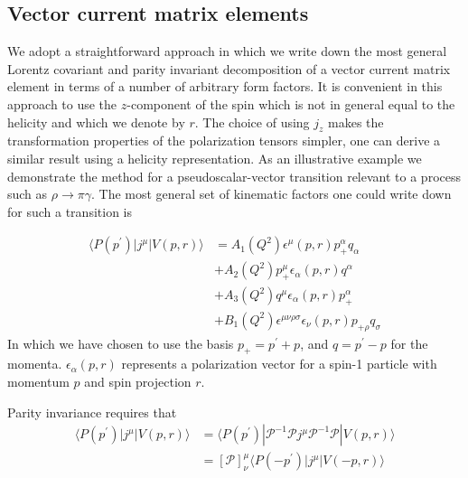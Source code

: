 \subsection{Vector current matrix elements} \label{ssec::RadTranLat::Decomp}

We adopt a straightforward approach in which we write down the most general Lorentz covariant and parity invariant decomposition of a vector current matrix element in terms of a number of arbitrary form factors. It is convenient in this approach to use the $z$-component of the spin which is not in general equal to the helicity and which we denote by $r$. The choice of using $j_z$ makes the transformation properties of the polarization tensors simpler, one can derive a similar result using a helicity representation. As an illustrative example we demonstrate the method for a pseudoscalar-vector transition relevant to a process such as $\rho \rightarrow \pi \gamma$.   The most general set of kinematic factors one could write down for such a transition is 

\begin{align*}
\langle P(p^\prime) | j^\mu | V(p,r) \rangle &= A_1(Q^2) \epsilon^\mu(p,r)p_+^\alpha q_\alpha \\
&+A_2(Q^2) p_+^\mu \epsilon_\alpha(p,r)q^\alpha \\
&+A_3(Q^2) q^\mu \epsilon_\alpha(p,r) p_+^\alpha \\
&+B_1(Q^2) \epsilon^{\mu\nu\rho\sigma}\epsilon_\nu(p,r)p_{+\rho}q_\sigma
\end{align*}
In which we have chosen to use the basis $p_+ = p^\prime + p$, and $q = p^\prime -p$ for the momenta. $\epsilon_\alpha(p,r)$ represents a polarization vector for a spin-1 particle with momentum $p$ and spin projection $r$. 

Parity invariance requires that 
\begin{align*}
\langle P(p^\prime) | j^\mu | V(p,r) \rangle &= \langle P(p^\prime) | \mathcal{P}^{-1}\mathcal{P} j^\mu  \mathcal{P}^{-1}\mathcal{P}  | V(p,r) \rangle  \\
&= \left[ \mathcal{P} \right]^\mu_\nu \langle P(-p^\prime) | j^\mu | V(-p,r) \rangle
\end{align*}

